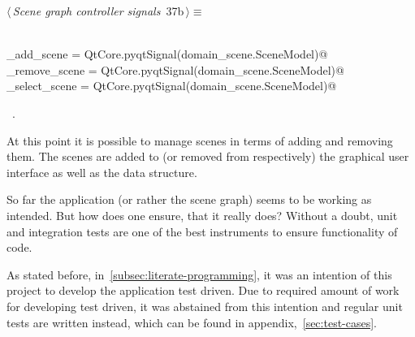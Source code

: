 \documentclass[
    a4paper,      %
    10pt,         %
    openright,    %
    notitlepage,  %
    parskip=half, %
]{scrreprt}       %
\theoremstyle{definition}                    %
\begin{document}
\begin{flushleft} \small
\begin{minipage}{\linewidth}\label{scrap45}\raggedright\small
{} $\langle\,${\itshape Scene graph controller signals}\nobreak\ {\footnotesize {37b}}$\,\rangle\equiv$
\vspace{-1ex}
\begin{list}{}{} \item
\mbox{}\lstinline@@\\
\mbox{}\lstinline@do_add_scene    = QtCore.pyqtSignal(domain_scene.SceneModel)@\\
\mbox{}\lstinline@do_remove_scene = QtCore.pyqtSignal(domain_scene.SceneModel)@\\
\mbox{}\lstinline@do_select_scene = QtCore.pyqtSignal(domain_scene.SceneModel)@\\
\mbox{}\lstinline@@{\NWsep}
\end{list}
\vspace{-1.5ex}
\footnotesize
\begin{list}{}{\setlength{\itemsep}{-\parsep}\setlength{\itemindent}{-\leftmargin}}
\item \NWtxtMacroRefIn\ .

\item{}
\end{list}
\end{minipage}\vspace{4ex}
\end{flushleft}

At this point it is possible to manage scenes in terms of adding and removing
them. The scenes are added to (or removed from respectively) the graphical user
interface as well as the data structure.

So far the application (or rather the scene graph) seems to be working as
intended. But how does one ensure, that it really does? Without a doubt, unit
and integration tests are one of the best instruments to ensure functionality of
code.

As stated before, in~\autoref{subsec:literate-programming}, it was an intention
of this project to develop the application test driven. Due to required amount
of work for developing test driven, it was abstained from this intention and
regular unit tests are written instead, which can be found in
appendix,~\autoref{sec:test-cases}.
\end{document}
